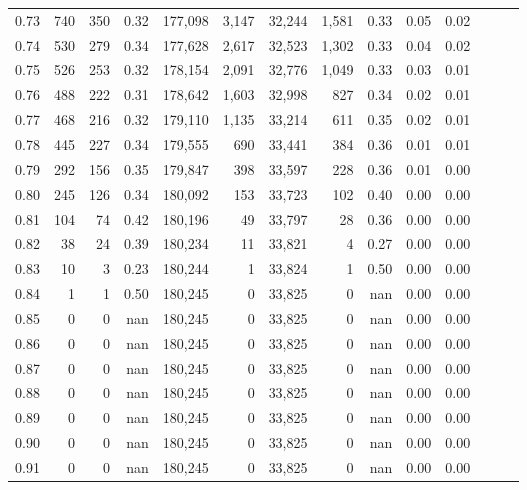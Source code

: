 \begin{tabular}{rrrrrrrrrrrrrr}
0.73 &    740 &    350 &  0.32 &  177,098 &    3,147 &  32,244 &   1,581 &  0.33 &  0.05 &      0.02 \\
0.74 &    530 &    279 &  0.34 &  177,628 &    2,617 &  32,523 &   1,302 &  0.33 &  0.04 &      0.02 \\
0.75 &    526 &    253 &  0.32 &  178,154 &    2,091 &  32,776 &   1,049 &  0.33 &  0.03 &      0.01 \\
0.76 &    488 &    222 &  0.31 &  178,642 &    1,603 &  32,998 &     827 &  0.34 &  0.02 &      0.01 \\
0.77 &    468 &    216 &  0.32 &  179,110 &    1,135 &  33,214 &     611 &  0.35 &  0.02 &      0.01 \\
0.78 &    445 &    227 &  0.34 &  179,555 &      690 &  33,441 &     384 &  0.36 &  0.01 &      0.01 \\
0.79 &    292 &    156 &  0.35 &  179,847 &      398 &  33,597 &     228 &  0.36 &  0.01 &      0.00 \\
0.80 &    245 &    126 &  0.34 &  180,092 &      153 &  33,723 &     102 &  0.40 &  0.00 &      0.00 \\
0.81 &    104 &     74 &  0.42 &  180,196 &       49 &  33,797 &      28 &  0.36 &  0.00 &      0.00 \\
0.82 &     38 &     24 &  0.39 &  180,234 &       11 &  33,821 &       4 &  0.27 &  0.00 &      0.00 \\
0.83 &     10 &      3 &  0.23 &  180,244 &        1 &  33,824 &       1 &  0.50 &  0.00 &      0.00 \\
0.84 &      1 &      1 &  0.50 &  180,245 &        0 &  33,825 &       0 &   nan &  0.00 &      0.00 \\
0.85 &      0 &      0 &   nan &  180,245 &        0 &  33,825 &       0 &   nan &  0.00 &      0.00 \\
0.86 &      0 &      0 &   nan &  180,245 &        0 &  33,825 &       0 &   nan &  0.00 &      0.00 \\
0.87 &      0 &      0 &   nan &  180,245 &        0 &  33,825 &       0 &   nan &  0.00 &      0.00 \\
0.88 &      0 &      0 &   nan &  180,245 &        0 &  33,825 &       0 &   nan &  0.00 &      0.00 \\
0.89 &      0 &      0 &   nan &  180,245 &        0 &  33,825 &       0 &   nan &  0.00 &      0.00 \\
0.90 &      0 &      0 &   nan &  180,245 &        0 &  33,825 &       0 &   nan &  0.00 &      0.00 \\
0.91 &      0 &      0 &   nan &  180,245 &        0 &  33,825 &       0 &   nan &  0.00 &      0.00 \\

\end{tabular}
